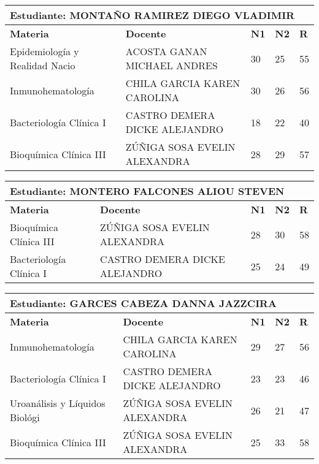 \small
\begin{tabularx}{\textwidth}{|p{5cm}|p{7cm}|X|X|X|}
\hline
\multicolumn{5}{|p{\dimexpr\textwidth-2\tabcolsep-2\arrayrulewidth}|}{\textbf{Estudiante: MONTAÑO RAMIREZ DIEGO VLADIMIR }}\\\hline
\textbf{Materia} & \textbf{Docente} & \textbf{N1} & \textbf{N2} & \textbf{R} \\ \hline
Epidemiología y Realidad Nacio & ACOSTA GANAN MICHAEL ANDRES  & 30 & 25& 55 \\ \hline
Inmunohematología & CHILA GARCIA KAREN CAROLINA  & 30 & 26& 56 \\ \hline
Bacteriología Clínica I & CASTRO DEMERA DICKE ALEJANDRO  & 18 & 22& 40 \\ \hline
Bioquímica Clínica III & ZÚÑIGA SOSA EVELIN ALEXANDRA  & 28 & 29& 57 \\ \hline
\end{tabularx}\vspace{10mm}
\small
\begin{tabularx}{\textwidth}{|p{5cm}|p{7cm}|X|X|X|}
\hline
\multicolumn{5}{|p{\dimexpr\textwidth-2\tabcolsep-2\arrayrulewidth}|}{\textbf{Estudiante: MONTERO FALCONES ALIOU STEVEN }}\\\hline
\textbf{Materia} & \textbf{Docente} & \textbf{N1} & \textbf{N2} & \textbf{R} \\ \hline
Bioquímica Clínica III & ZÚÑIGA SOSA EVELIN ALEXANDRA  & 28 & 30& 58 \\ \hline
Bacteriología Clínica I & CASTRO DEMERA DICKE ALEJANDRO  & 25 & 24& 49 \\ \hline
\end{tabularx}\vspace{10mm}
\small
\begin{tabularx}{\textwidth}{|p{5cm}|p{7cm}|X|X|X|}
\hline
\multicolumn{5}{|p{\dimexpr\textwidth-2\tabcolsep-2\arrayrulewidth}|}{\textbf{Estudiante: GARCES CABEZA DANNA JAZZCIRA }}\\\hline
\textbf{Materia} & \textbf{Docente} & \textbf{N1} & \textbf{N2} & \textbf{R} \\ \hline
Inmunohematología & CHILA GARCIA KAREN CAROLINA  & 29 & 27& 56 \\ \hline
Bacteriología Clínica I & CASTRO DEMERA DICKE ALEJANDRO  & 23 & 23& 46 \\ \hline
Uroanálisis y Líquidos Biológi & ZÚÑIGA SOSA EVELIN ALEXANDRA  & 26 & 21& 47 \\ \hline
Bioquímica Clínica III & ZÚÑIGA SOSA EVELIN ALEXANDRA  & 25 & 33& 58 \\ \hline
\end{tabularx}\vspace{10mm}
